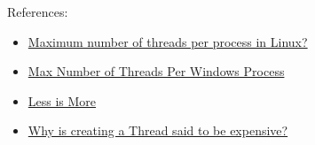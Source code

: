 \documentclass[12pt]{article}
\begin{document}
References:

\begin{itemize}
\tightlist
\item
  \href{https://stackoverflow.com/questions/344203/maximum-number-of-threads-per-process-in-linux}{Maximum number of threads per process in Linux?}
\item
  \href{https://eknowledger.wordpress.com/2012/05/01/max-number-of-threads-per-windows-process/}{Max Number of Threads Per Windows Process}
\item
  \href{http://baddotrobot.com/blog/2009/02/26/less-is-more/}{Less is More}
\item
  \href{https://stackoverflow.com/questions/5483047/why-is-creating-a-thread-said-to-be-expensive}{Why is creating a Thread said to be expensive?}
\end{itemize}
\end{document}
